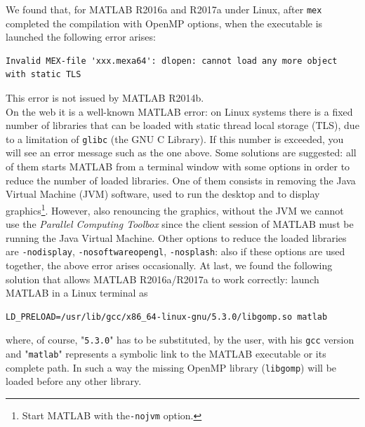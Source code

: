 \documentclass[a4paper,10pt]{report}%
\begin{document}
We found that, for MATLAB R2016a and R2017a under Linux, after {\tt mex} completed the compilation with OpenMP
options, when the executable is launched the following error arises:
\begin{lstlisting}
Invalid MEX-file 'xxx.mexa64': dlopen: cannot load any more object with static TLS
\end{lstlisting}
This error is not issued by MATLAB R2014b.
\\
On the web it is a well-known MATLAB error: on Linux systems there is a fixed number of libraries that can be
loaded with static thread local storage (TLS), due to a limitation of {\tt glibc} (the GNU C Library). If this
number is exceeded, you will see an error message such as the one above.
Some solutions are suggested: all of them starts MATLAB from a terminal window with some options in order to
reduce the number of loaded libraries.
One of them consists in removing the Java Virtual Machine (JVM) software, used to run the desktop and to
display graphics\footnote{ Start MATLAB with the{\tt -nojvm} option.}. However, also renouncing the graphics,
without the JVM we cannot use the {\em Parallel Computing Toolbox} since the client session of MATLAB must be running the Java Virtual Machine.
Other options to reduce the loaded libraries are {\tt -nodisplay}, {\tt -nosoftwareopengl}, {\tt -nosplash}:
also if these options are used together, the above error arises occasionally.
At last, we found the following solution that allows MATLAB R2016a/R2017a to work correctly: launch MATLAB in
a Linux terminal as
\begin{lstlisting}[frame=none]
LD_PRELOAD=/usr/lib/gcc/x86_64-linux-gnu/5.3.0/libgomp.so matlab
\end{lstlisting}
where, of course, "{\tt 5.3.0}" has to be substituted, by the user, with his {\tt gcc} version and
"{\tt matlab}" represents a symbolic link to the MATLAB executable or its complete path.
In such a way the missing OpenMP library ({\tt libgomp}) will be loaded before any other library.



\end{document}
